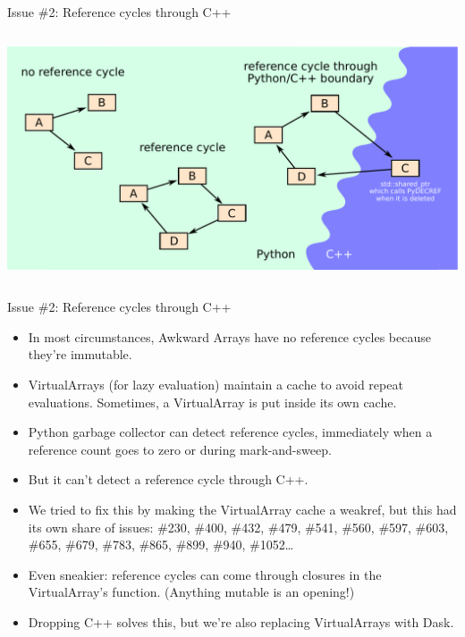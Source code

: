 \documentclass[aspectratio=169]{beamer}
\begin{document}
\begin{frame}{Issue \#2: Reference cycles through C++}
\vspace{0.15 cm}

\begin{columns}
\includegraphics[width=\linewidth]{python-cpp-reference-cycles.pdf}
\end{columns}
\end{frame}

\begin{frame}{Issue \#2: Reference cycles through C++}
\large
\vspace{0.25 cm}
\begin{itemize}\setlength{\itemsep}{0.15 cm}
\item<1-> In most circumstances, Awkward Arrays have no reference cycles because they're immutable.

\item<2-> VirtualArrays (for lazy evaluation) maintain a cache to avoid repeat evaluations. Sometimes, a VirtualArray is put inside its own cache.

\item<3-> Python garbage collector can detect reference cycles, immediately when a reference count goes to zero or during mark-and-sweep.

\item<4-> But it can't detect a reference cycle through C++.

\item<5-> We tried to fix this by making the VirtualArray cache a weakref, but this had its own share of issues: {\normalsize \#230, \#400, \#432, \#479, \#541, \#560, \#597, \#603, \#655, \#679, \#783, \#865, \#899, \#940, \#1052\ldots}

\item<6-> Even sneakier: reference cycles can come through closures in the VirtualArray's function. (Anything mutable is an opening!)

\item<7-> Dropping C++ solves this, but we're also replacing VirtualArrays with Dask.
\end{itemize}
\end{frame}
\end{document}
